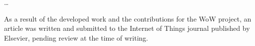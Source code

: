 
\dots

As a result of the developed work and the contributions for the \acs{WoW} project, an article \cite{Fama2021} was written and submitted to the Internet of Things journal published by Elsevier, pending review at the time of writing. 

